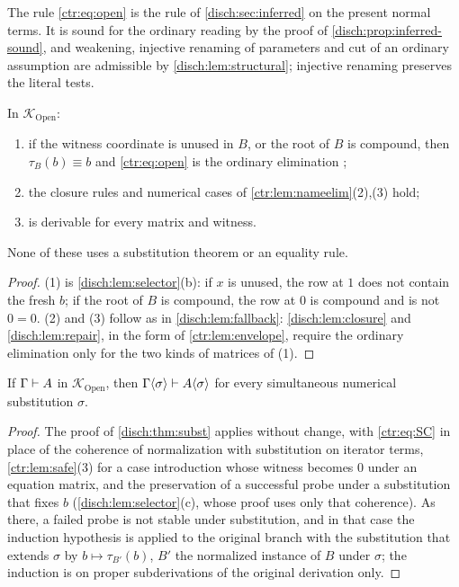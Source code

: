 The rule \eqref{ctr:eq:open} is the rule  of \cref{disch:sec:inferred} on
the present normal terms. It is sound for the ordinary reading by the proof of
\cref{disch:prop:inferred-sound}, and weakening, injective renaming of parameters and cut of
an ordinary assumption are admissible by \cref{disch:lem:structural}; injective renaming
preserves the literal tests.

\begin{lemma}\label{ctr:lem:safe}
In $\mathcal K_{\mathrm{Open}}$:
\begin{enumerate}
\item if the witness coordinate is unused in $B$, or the root of $B$ is compound, then
$\tau_B(b)\equiv b$ and \eqref{ctr:eq:open} is the ordinary elimination ;
\item the closure rules and numerical cases of \cref{ctr:lem:nameelim}(2),(3) hold;
\item {} is derivable for every matrix and witness.
\end{enumerate}
None of these uses a substitution theorem or an equality rule.
\end{lemma}
\begin{proof}
(1) is \cref{disch:lem:selector}(b): if $x$ is unused, the row at $1$ does not contain the
fresh $b$; if the root of $B$ is compound, the row at $0$ is compound and is not $0=0$.
(2) and (3) follow as in \cref{disch:lem:fallback}: \cref{disch:lem:closure} and
\cref{disch:lem:repair}, in the form of \cref{ctr:lem:envelope}, require the ordinary
elimination only for the two kinds of matrices of (1).
\end{proof}

\begin{lemma}[Substitution]\label{ctr:lem:opensubst}
If $\Gamma\vdash A$ in $\mathcal K_{\mathrm{Open}}$, then
$\Gamma\langle\sigma\rangle\vdash A\langle\sigma\rangle$ for every simultaneous numerical
substitution $\sigma$.
\end{lemma}
\begin{proof}
The proof of \cref{disch:thm:subst} applies without change, with \eqref{ctr:eq:SC} in place
of the coherence of normalization with substitution on iterator terms, \cref{ctr:lem:safe}(3)
for a case introduction whose witness becomes $0$ under an equation matrix, and the
preservation of a successful probe under a substitution that fixes $b$
(\cref{disch:lem:selector}(c), whose proof uses only that coherence). As there, a failed
probe is not stable under substitution, and in that case the induction hypothesis is applied
to the original branch with the substitution that extends $\sigma$ by $b\mapsto\tau_{B'}(b)$,
$B'$ the normalized instance of $B$ under $\sigma$; the induction is on proper
subderivations of the original derivation only.
\end{proof}

